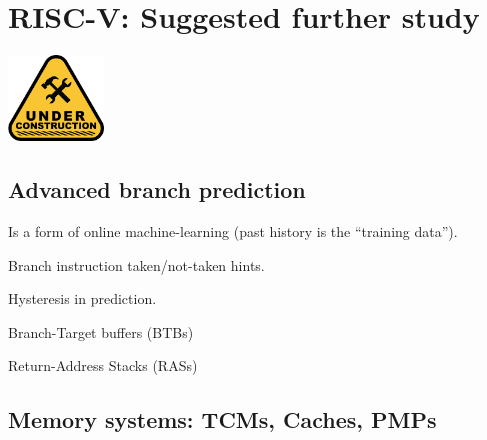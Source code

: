 

\chapter{RISC-V: Suggested further study}


\setcounter{page}{1}
\renewcommand{\thepage}{\arabic{chapter}-\arabic{page}}

\label{ch_RISCV_further_study}


\vspace{2ex}

\centerline{\includegraphics[width=1in,angle=0]{Figures/Fig_Under_Construction}}

\vspace{2ex}


\section{Advanced branch prediction}

Is a form of online machine-learning (past history is the ``training data'').

Branch instruction taken/not-taken hints.

Hysteresis in prediction.

Branch-Target buffers (BTBs)

Return-Address Stacks (RASs)


\section{Memory systems: TCMs, Caches, PMPs}

